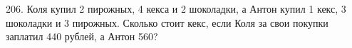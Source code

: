 206. Коля купил 2 пирожных, 4 кекса и 2 шоколадки, а Антон купил 1 кекс, 3 шоколадки и 3 пирожных. Сколько стоит кекс, если Коля за свои покупки заплатил 440 рублей, а Антон 560?\\
